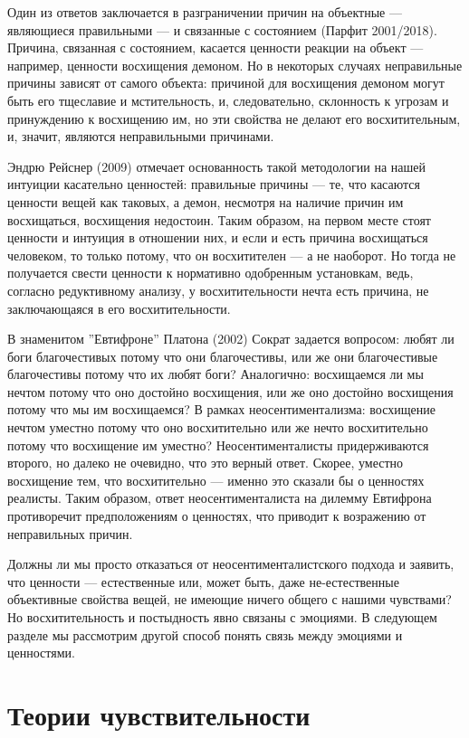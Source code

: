 \documentclass[11pt]{book}
\begin{document}
Один из ответов заключается в разграничении причин на объектные --- являющиеся правильными --- и связанные с состоянием (Парфит 2001/2018). Причина, связанная с состоянием, касается ценности реакции на объект --- например, ценности восхищения демоном. Но в некоторых случаях неправильные причины зависят от самого объекта: причиной для восхищения демоном могут быть его тщеславие и мстительность, и, следовательно, склонность к угрозам и принуждению к восхищению им, но эти свойства не делают его восхитительным, и, значит, являются неправильными причинами.

Эндрю Рейснер (2009) отмечает основанность такой методологии на нашей интуиции касательно ценностей: правильные причины --- те, что касаются ценности вещей как таковых, а демон, несмотря на наличие причин им восхищаться, восхищения недостоин. Таким образом, на первом месте стоят ценности и интуиция в отношении них, и если и есть причина восхищаться человеком, то только потому, что он восхитителен --- а не наоборот. Но тогда не получается свести ценности к нормативно одобренным установкам, ведь, согласно редуктивному анализу, у восхитительности нечта есть причина, не заключающаяся в его восхитительности.

В знаменитом ''Евтифроне'' Платона (2002) Сократ задается вопросом: любят ли боги благочестивых потому что они благочестивы, или же они благочестивые благочестивы потому что их любят боги? Аналогично: восхищаемся ли мы нечтом потому что оно достойно восхищения, или же оно достойно восхищения потому что мы им восхищаемся? В рамках неосентиментализма: восхищение нечтом уместно потому что оно восхитительно или же нечто восхитительно потому что восхищение им уместно? Неосентименталисты придерживаются второго, но далеко не очевидно, что это верный ответ. Скорее, уместно восхищение тем, что восхитительно --- именно это сказали бы о ценностях реалисты. Таким образом, ответ неосентименталиста на дилемму Евтифрона противоречит предположениям о ценностях, что приводит к возражению от неправильных причин.

Должны ли мы просто отказаться от неосентименталистского подхода и заявить, что ценности --- естественные или, может быть, даже не-естественные объективные свойства вещей, не имеющие ничего общего с нашими чувствами? Но восхитительность и постыдность явно связаны с эмоциями. В следующем разделе мы рассмотрим другой способ понять связь между эмоциями и ценностями.

\section{Теории чувствительности}
\end{document}
